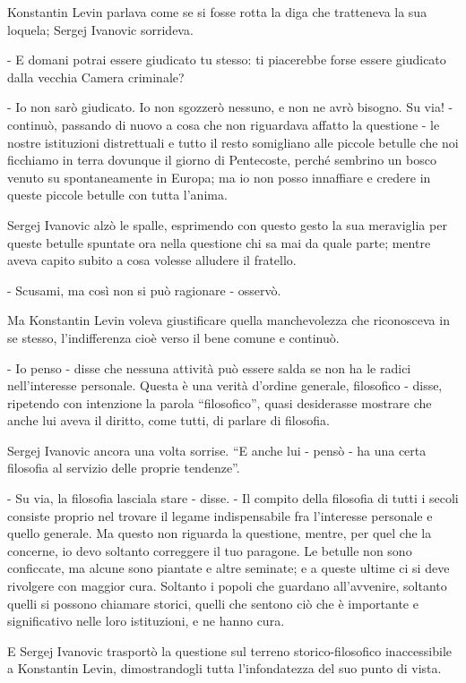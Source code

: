 Konstantin Levin parlava come se si fosse rotta la diga che tratteneva la sua loquela; Sergej Ivanovic sorrideva. 

- E domani potrai essere giudicato tu stesso: ti piacerebbe forse essere giudicato dalla vecchia Camera criminale? 

- Io non sarò giudicato. Io non sgozzerò nessuno, e non ne avrò bisogno. Su via! - continuò, passando di nuovo a cosa che non riguardava affatto la questione - le nostre istituzioni distrettuali e tutto il resto somigliano alle piccole betulle che noi ficchiamo in terra dovunque il giorno di Pentecoste, perché sembrino un bosco venuto su spontaneamente in Europa; ma io non posso innaffiare e credere in queste piccole betulle con tutta l'anima. 

Sergej Ivanovic alzò le spalle, esprimendo con questo gesto la sua meraviglia per queste betulle spuntate ora nella questione chi sa mai da quale parte; mentre aveva capito subito a cosa volesse alludere il fratello. 

- Scusami, ma così non si può ragionare - osservò. 

Ma Konstantin Levin voleva giustificare quella manchevolezza che riconosceva in se stesso, l'indifferenza cioè verso il bene comune e continuò. 

- Io penso - disse che nessuna attività può essere salda se non ha le radici nell'interesse personale. Questa è una verità d'ordine generale, filosofico - disse, ripetendo con intenzione la parola ``filosofico'', quasi desiderasse mostrare che anche lui aveva il diritto, come tutti, di parlare di filosofia. 

Sergej Ivanovic ancora una volta sorrise. ``E anche lui - pensò - ha una certa filosofia al servizio delle proprie tendenze''. 

- Su via, la filosofia lasciala stare - disse. - Il compito della filosofia di tutti i secoli consiste proprio nel trovare il legame indispensabile fra l'interesse personale e quello generale. Ma questo non riguarda la questione, mentre, per quel che la concerne, io devo soltanto correggere il tuo paragone. Le betulle non sono conficcate, ma alcune sono piantate e altre seminate; e a queste ultime ci si deve rivolgere con maggior cura. Soltanto i popoli che guardano all'avvenire, soltanto quelli si possono chiamare storici, quelli che sentono ciò che è importante e significativo nelle loro istituzioni, e ne hanno cura. 

E Sergej Ivanovic trasportò la questione sul terreno storico-filosofico inaccessibile a Konstantin Levin, dimostrandogli tutta l'infondatezza del suo punto di vista. 

